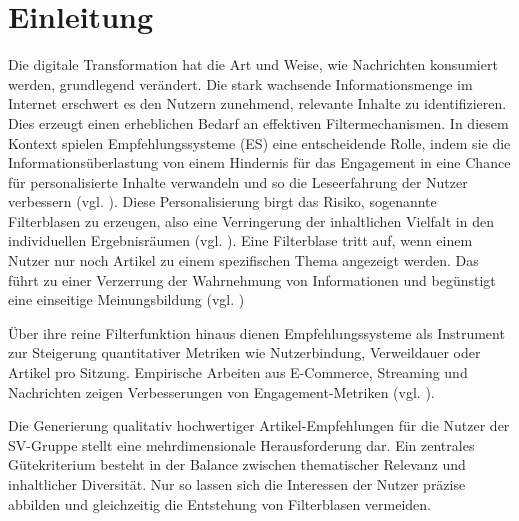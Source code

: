 \section{Einleitung}

Die digitale Transformation hat die Art und Weise, wie Nachrichten konsumiert werden, grundlegend verändert. 
Die stark wachsende Informationsmenge im Internet erschwert es den Nutzern zunehmend,
relevante Inhalte zu identifizieren. Dies erzeugt einen erheblichen Bedarf an effektiven Filtermechanismen.
In diesem Kontext spielen Empfehlungssysteme (ES) eine entscheidende Rolle, 
indem sie die Informationsüberlastung von einem Hindernis für das Engagement in eine Chance für personalisierte 
Inhalte verwandeln und so die Leseerfahrung der Nutzer verbessern (vgl. \cite{wu_personalized_2022}).
Diese Personalisierung birgt das Risiko, sogenannte Filterblasen zu erzeugen, also eine Verringerung der inhaltlichen
Vielfalt in den individuellen Ergebnisräumen (vgl. \Cite{nguyen_filter_bubble_2014}).
Eine Filterblase tritt auf, wenn einem Nutzer nur noch Artikel zu einem spezifischen Thema angezeigt werden. 
Das führt zu einer Verzerrung der Wahrnehmung von Informationen und begünstigt eine einseitige Meinungsbildung (vgl. \cite{nguyen_filter_bubble_2014})

Über ihre reine Filterfunktion hinaus dienen Empfehlungssysteme als Instrument zur Steigerung quantitativer 
Metriken wie Nutzerbindung, Verweildauer oder Artikel pro Sitzung. Empirische Arbeiten aus 
E-Commerce, Streaming und Nachrichten zeigen Verbesserungen von Engagement-Metriken 
(vgl. \cite{linden_amazon_2003,covington_DNN_YT_Recommendations_2016,raza_news_2020}).

Die Generierung qualitativ hochwertiger Artikel-Empfehlungen für die Nutzer der \ac{SV-Gruppe} stellt eine 
mehrdimensionale Herausforderung dar. 
Ein zentrales Gütekriterium besteht in der Balance zwischen thematischer Relevanz und inhaltlicher Diversität. 
Nur so lassen sich die Interessen der Nutzer präzise abbilden und gleichzeitig die Entstehung von Filterblasen vermeiden.

